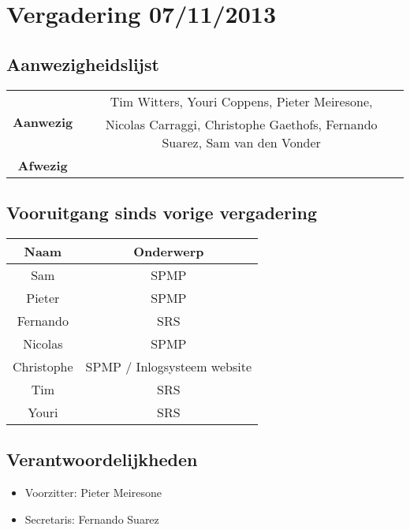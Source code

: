 \section{Vergadering 07/11/2013}
\subsection{Aanwezigheidslijst}
\begin{table}[htbp]
	\centering
	\begin{tabular}{c|c}
		\multirow{2}{*}{\textbf{Aanwezig}} & Tim Witters, Youri Coppens, Pieter Meiresone, \\
		& Nicolas Carraggi,  Christophe Gaethofs, Fernando Suarez, Sam van den Vonder \\
		\hline
		\textbf{Afwezig} & \\
	\end{tabular}
\end{table}

\subsection{Vooruitgang sinds vorige vergadering}

\begin{table}[htbp]
	\begin{tabular}{c|c}
		\textbf{Naam} & \textbf{Onderwerp} \\ \hline
		Sam & SPMP \\
		Pieter & SPMP \\
		Fernando & SRS \\
		Nicolas & SPMP \\
		Christophe & SPMP / Inlogsysteem website \\
		Tim & SRS \\
		Youri & SRS \\
	\end{tabular}
\end{table}

\subsection{Verantwoordelijkheden}
\begin{itemize}
	\item Voorzitter: Pieter Meiresone
	\item Secretaris: Fernando Suarez
\end{itemize}

